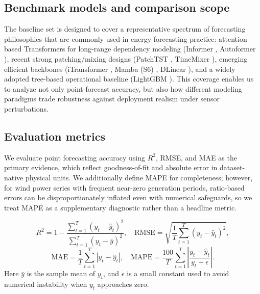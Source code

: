 \documentclass[review,3p,times]{elsarticle}
\begin{document}
\subsection{Benchmark models and comparison scope}

The baseline set is designed to cover a representative spectrum of forecasting philosophies that are commonly used in energy forecasting practice: attention-based Transformers for long-range dependency modeling (Informer \cite{zhou2021informer}, Autoformer \cite{wu2021autoformer}), recent strong patching/mixing designs (PatchTST \cite{nie2023patchtst}, TimeMixer \cite{wang2024timemixer}), emerging efficient backbones (iTransformer \cite{liu2024itransformer}, Mamba (S6) \cite{gu2023mamba}, DLinear \cite{zeng2023dlinear}), and a widely adopted tree-based operational baseline (LightGBM \cite{ke2017lightgbm}). This coverage enables us to analyze not only point-forecast accuracy, but also how different modeling paradigms trade robustness against deployment realism under sensor perturbations.

\subsection{Evaluation metrics}

We evaluate point forecasting accuracy using $R^2$, RMSE, and MAE as the primary evidence, which reflect goodness-of-fit and absolute error in dataset-native physical units.
We additionally define MAPE for completeness; however, for wind power series with frequent near-zero generation periods, ratio-based errors can be disproportionately inflated even with numerical safeguards, so we treat MAPE as a supplementary diagnostic rather than a headline metric.

\begin{equation}
R^2 = 1 - \frac{\sum_{t=1}^{T}(y_t - \hat{y}_t)^2}{\sum_{t=1}^{T}(y_t - \bar{y})^2}, 
\quad
\text{RMSE} = \sqrt{\frac{1}{T}\sum_{t=1}^{T}(y_t - \hat{y}_t)^2},
\end{equation}
\begin{equation}
\text{MAE} = \frac{1}{T}\sum_{t=1}^{T}|y_t - \hat{y}_t|,
\quad
\text{MAPE} = \frac{100}{T}\sum_{t=1}^{T}\left|\frac{y_t - \hat{y}_t}{y_t + \epsilon}\right|.
\end{equation}
Here $\bar{y}$ is the sample mean of $y_t$, and $\epsilon$ is a small constant used to avoid numerical instability when $y_t$ approaches zero.
\end{document}
